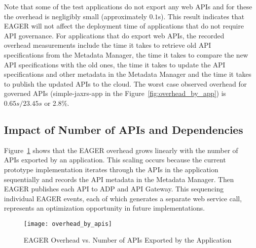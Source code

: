 Note that some of the test applications do not export any web APIs and
for these the overhead
is negligibly small (approximately $0.1$s). 
This result indicates that EAGER
will not affect the deployment time of applications that do not require API
governance. 
For applications that do
export web APIs, the recorded overhead measurements include the time it takes to
retrieve old API specifications from the Metadata Manager, the time it takes
to compare the new API specifications with the old ones, the time it takes to
update the API specifications and other metadata in the Metadata Manager and
the time it takes to publish the updated APIs to the cloud.  
The worst case observed overhead for governed APIs (simple-jaxrs-app in the
Figure~\ref{fig:overhead_by_app}) is
$0.65s / 23.45s$ or 2.8\%.


\subsection{Impact of Number of APIs and Dependencies}

Figure~\ref{fig:overhead_by_apis} shows that the EAGER overhead grows linearly
with the number of APIs exported by an application.  This scaling occurs
because the current prototype implementation iterates through the APIs in the
application sequentially and records the API metadata in the Metadata Manager.
Then EAGER publishes each API to ADP and API Gateway. This sequencing
individual EAGER events, each of which generates a separate web service call,
represents an optimization opportunity in future implementations.

\begin{figure}
\centering
\texttt{[image: overhead\_by\_apis]}
\vspace{-0.01in}
\caption{EAGER Overhead vs. Number of APIs Exported by the Application}
\label{fig:overhead_by_apis}
\end{figure}

